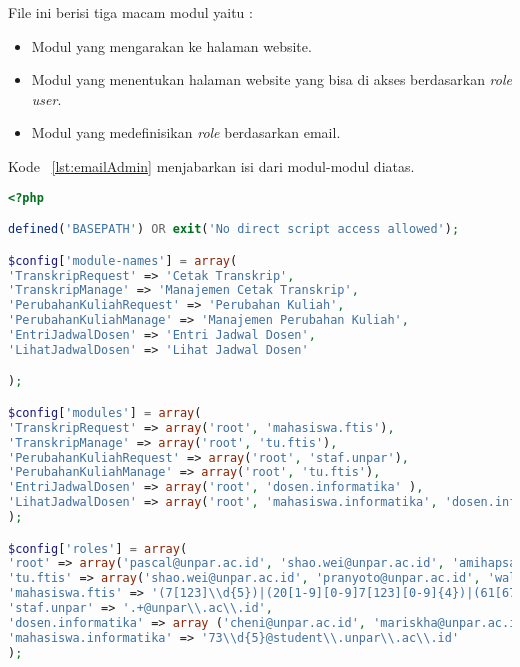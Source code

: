 File ini berisi tiga macam modul yaitu :
\begin{itemize}
	\item Modul yang mengarakan ke halaman website.
	\item Modul yang menentukan halaman website yang bisa di akses berdasarkan \textit{role user}.
	\item Modul yang medefinisikan \textit{role} berdasarkan email.
\end{itemize}
Kode ~\ref{lst:emailAdmin} menjabarkan isi dari modul-modul diatas.
\begin{lstlisting}[language=PHP, caption=Penambahan email admin., basicstyle=\footnotesize\ttfamily, frame=single,
columns=fullflexible, keepspaces=true, breaklines=true, showstringspaces=false, label={lst:emailAdmin}]
<?php

defined('BASEPATH') OR exit('No direct script access allowed');

$config['module-names'] = array(
'TranskripRequest' => 'Cetak Transkrip',
'TranskripManage' => 'Manajemen Cetak Transkrip',
'PerubahanKuliahRequest' => 'Perubahan Kuliah',
'PerubahanKuliahManage' => 'Manajemen Perubahan Kuliah',
'EntriJadwalDosen' => 'Entri Jadwal Dosen',
'LihatJadwalDosen' => 'Lihat Jadwal Dosen'

);

$config['modules'] = array(
'TranskripRequest' => array('root', 'mahasiswa.ftis'),
'TranskripManage' => array('root', 'tu.ftis'),
'PerubahanKuliahRequest' => array('root', 'staf.unpar'),
'PerubahanKuliahManage' => array('root', 'tu.ftis'),
'EntriJadwalDosen' => array('root', 'dosen.informatika' ),
'LihatJadwalDosen' => array('root', 'mahasiswa.informatika', 'dosen.informatika')
);

$config['roles'] = array(
'root' => array('pascal@unpar.ac.id', 'shao.wei@unpar.ac.id', 'amihapsahapsa@gmail.com'),
'tu.ftis' => array('shao.wei@unpar.ac.id', 'pranyoto@unpar.ac.id', 'walip@unpar.ac.id', 'dwina@unpar.ac.id'),
'mahasiswa.ftis' => '(7[123]\\d{5})|(20[1-9][0-9]7[123][0-9]{4})|(61[678][0-9]{7})@student\\.unpar\\.ac\\.id',
'staf.unpar' => '.+@unpar\\.ac\\.id',
'dosen.informatika' => array ('cheni@unpar.ac.id', 'mariskha@unpar.ac.id', 'anung@unpar.ac.id', 'moertini@unpar.ac.id', 'natalia@unpar.ac.id', 'chandraw@unpar.ac.id', 'elisatih@unpar.ac.id', 'gkarya@unpar.ac.id', 'husnulhakim@unpar.ac.id', 'joanna@unpar.ac.id', 'lionov@unpar.ac.id', 'luciana@unpar.ac.id', 'pascal@unpar.ac.id', 'rosad5@unpar.ac.id', 'vania.natali@unpar.ac.id', 'kristopher.h@unpar.ac.id', 'raymond.chandra@unpar.ac.id', 'keenan.leman@unpar.ac.id'),
'mahasiswa.informatika' => '73\\d{5}@student\\.unpar\\.ac\\.id'
);
\end{lstlisting}

